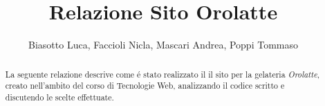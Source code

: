 \documentclass[10 pt]{extarticle}
\title{Relazione Sito Orolatte}
\author{Biasotto Luca, Faccioli Nicla, Mascari Andrea, Poppi Tommaso}
\date{}
\begin{document}
\maketitle
\begin{abstract}
La seguente relazione descrive come \'e stato realizzato il il sito per la gelateria \emph{Orolatte}, creato nell'ambito del corso di Tecnologie Web, analizzando il codice scritto e discutendo le scelte effettuate.
\end{abstract}
\pagebreak
\tableofcontents
\pagebreak

 
 \pagebreak
 
 \pagebreak
 
 \pagebreak
 
 \pagebreak
 
\end{document}
